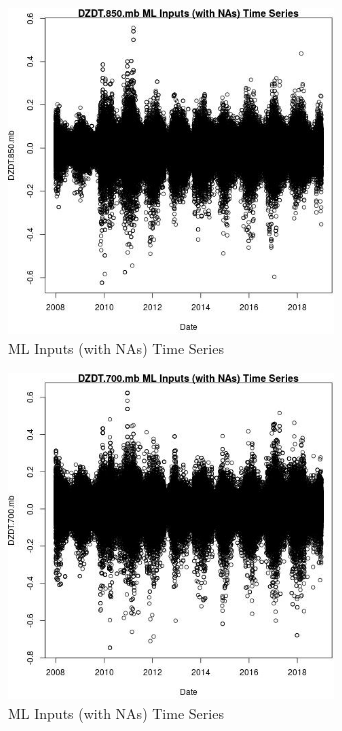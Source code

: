 \begin{figure} 
\centering  
\includegraphics[width=0.77\textwidth]{Code_Outputs/Report_ML_input_PM25_Step4_part_f_de_duplicated_aves_prioritize_24hr_obswNAs_DZDT850mbvDate.jpg} 
\caption{\label{fig:Report_ML_input_PM25_Step4_part_f_de_duplicated_aves_prioritize_24hr_obswNAsDZDT850mbvDate}ML Inputs (with NAs) Time Series} 
\end{figure} 
 

\begin{figure} 
\centering  
\includegraphics[width=0.77\textwidth]{Code_Outputs/Report_ML_input_PM25_Step4_part_f_de_duplicated_aves_prioritize_24hr_obswNAs_DZDT700mbvDate.jpg} 
\caption{\label{fig:Report_ML_input_PM25_Step4_part_f_de_duplicated_aves_prioritize_24hr_obswNAsDZDT700mbvDate}ML Inputs (with NAs) Time Series} 
\end{figure} 
 

